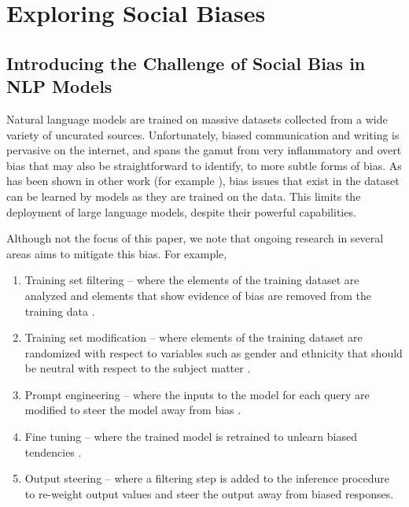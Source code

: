 \documentclass[11pt]{article}
\begin{document}
\section{Exploring Social Biases}
\label{sec:biases}

\subsection{Introducing the Challenge of Social Bias in NLP Models}

Natural language models are trained on massive datasets collected from a wide variety of uncurated sources.  
Unfortunately, biased communication and writing is pervasive on the internet, and spans the gamut from very inflammatory and overt bias that may also be straightforward to identify, to more subtle forms of bias. 
As has been shown in other work (for example \cite{brown2020language,deepmindethicalai,Rae2021Gopher}), bias issues that exist in the dataset can be learned by models as they are trained on the data. 
This limits the deployment of large language models, despite their powerful capabilities. 

Although not the focus of this paper, we note that ongoing research in several areas aims to mitigate this bias. 
For example,
\begin{enumerate}[label=\alph*)]
    \item Training set filtering – where the elements of the training dataset are analyzed and elements that show evidence of bias are removed from the training data \cite{ngo2021mitigating}.
    \item Training set modification – where elements of the training dataset are randomized with respect to variables such as gender and ethnicity that should be neutral with respect to the subject matter \cite{welbl2021challenges}.
    \item Prompt engineering – where the inputs to the model for each query are modified to steer the model away from bias \cite{schick2021self,fatemi2021improving}.
    \item Fine tuning – where the trained model is retrained to unlearn biased tendencies \cite{gehman2020realtoxicityprompts,gururangan-etal-2020-dont,krause2021gedi}.
    \item Output steering – where a filtering step is added to the inference procedure to re-weight output values and steer the output away from biased responses. 
\end{enumerate}
\end{document}
